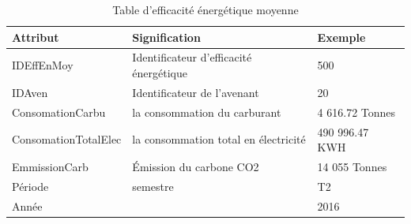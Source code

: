\documentclass[a4paper]{report}
\begin{document}
\begin{doublespace}
	\begin{table}[H]
		\begin{center}
			\begin{tabularx}{17.5cm}{|X|X|X|}
				\hline
				\textbf{Attribut}    & \textbf{Signification}                  &
				\textbf{Exemple}                                                          \\
				\hline
				IDEffEnMoy           & Identificateur d’efficacité énergétique &
				500                                                                       \\
				\hline
				IDAven               & Identificateur de l'avenant             & 20       \\
				\hline
				ConsomationCarbu     & la consommation du carburant             & 4 616.72
				Tonnes                                                                    \\
				\hline
				ConsomationTotalElec & la consommation total en électricité     & 490
				996.47 KWH                                                                \\
				\hline
				EmmissionCarb        & Émission du carbone CO2                 & 14 055
				Tonnes                                                                    \\
				\hline
				Période              & semestre                                & T2       \\
				\hline
				Année                &                                         & 2016     \\
				\hline
			\end{tabularx}
			\caption{Table d’efficacité énergétique moyenne}
		\end{center}
	\end{table}


\end{doublespace}
\end{document}
